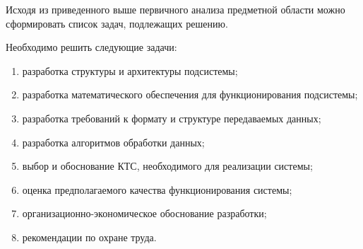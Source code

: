 Исходя из приведенного выше первичного анализа предметной области можно сформировать список задач, подлежащих решению.

Необходимо решить следующие задачи:

\begin{enumerate}
\item разработка структуры и архитектуры подсистемы;
\item разработка математического обеспечения для функционирования подсистемы; 
\item разработка требований к формату и структуре передаваемых данных;
\item разработка алгоритмов обработки данных;
\item выбор и обоснование КТС, необходимого для реализации системы;
\item оценка предполагаемого качества функционирования системы;
\item организационно-экономическое обоснование разработки;
\item рекомендации по охране труда.
\end{enumerate}



